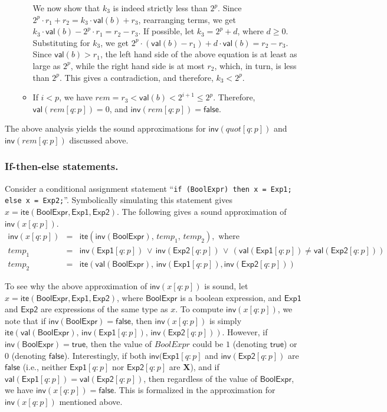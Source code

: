 \documentclass{llncs}
\newcommand{\val}{\ensuremath{\mathsf{val}}}
\newcommand{\inv}{\ensuremath{\mathsf{inv}}}
\newcommand{\ite}{\ensuremath{\mathsf{ite}}}
\newcommand{\true}{\ensuremath{\mathsf{true}}}
\newcommand{\false}{\ensuremath{\mathsf{false}}}
\begin{document}
\begin{itemize}
\begin{itemize}
      We now show that $k_3$ is indeed strictly less than $2^p$.
      Since $2^p\cdot r_1 + r_2 = k_3\cdot {\val}(b) + r_3$,
      rearranging terms, we get $k_3\cdot {\val}(b) - 2^p\cdot r_1 =
      r_2 - r_3$.  If possible, let $k_3 = 2^p + d$, where $d \ge 0$.
      Substituting for $k_3$, we get $2^p\cdot({\val}(b) - r_1) +
      d\cdot {\val}(b) = r_2 - r_3$.  Since ${\val}(b) > r_1$, the
      left hand side of the above equation is at least as large as $
      2^p$, while the right hand side is at most $r_2$, which, in
      turn, is less than $ 2^p$.  This gives a contradiction, and
      therefore, $k_3 < 2^p$.
    \item If $i < p$, we have $rem = r_3 < {\val}(b) < 2^{i+1} \le 2^p$.
      Therefore, ${\val}(rem[q:p]) = 0$, and ${\inv}(rem[q:p]) = \false$.
  \end{itemize}
\end{itemize}
The above analysis yields the sound approximations for
${\inv}(quot[q:p])$ and ${\inv}(rem[q:p])$ discussed above.

\subsubsection{If-then-else statements.} Consider a conditional
assignment statement ``{\tt if (BoolExpr) then x = Exp1; else x =
  Exp2;}''.  Symbolically simulating this statement gives $x =
{\ite}(\mathsf{BoolExpr}, \mathsf{Exp1}, \mathsf{Exp2})$.  The
following gives a sound approximation of ${\inv}(x[q:p])$. \begin{eqnarray}
{\inv}(x[q:p]) & = & {\ite}({\inv}(\mathsf{BoolExpr}), \, temp_1, \, temp_2), \text{ where } \nonumber \\
temp_1         & = & {\inv}(\mathsf{Exp1}[q:p])\,\vee\,{\inv}(\mathsf{Exp2}[q:p])\,\vee\,({\val}(\mathsf{Exp1}[q:p]) \ne {\val}(\mathsf{Exp2}[q:p])) \nonumber \\
temp_2         & = & {\ite}({\val}(\mathsf{BoolExpr}), \,{\inv}(\mathsf{Exp1}[q:p]), {\inv}(\mathsf{Exp2}[q:p])) \nonumber \end{eqnarray}

To see why the above approximation of ${\inv}(x[q:p])$ is sound, let
$x = {\ite}(\mathsf{BoolExpr}, \mathsf{Exp1}, \mathsf{Exp2})$, where
$\mathsf{BoolExpr}$ is a boolean expression, and $\mathsf{Exp1}$ and
$\mathsf{Exp2}$ are expressions of the same type as $x$.  To compute
${\inv}(x[q:p])$, we note that if ${\inv}(\mathsf{BoolExpr}) =
\false$, then ${\inv}(x[q:p])$ is simply
${\ite}({\val}(\mathsf{BoolExpr}), \,{\inv}(\mathsf{Exp1}[q:p]),
\,{\inv}(\mathsf{Exp2}[q:p]))$.  However, if
${\inv}(\mathsf{BoolExpr}) = \true$, then the value of ${BoolExpr}$
could be $1$ (denoting $\true$) or $0$ (denoting $\false$).
Interestingly, if both ${\inv}(\mathsf{Exp1}[q:p]$ and
${\inv}(\mathsf{Exp2}[q:p])$ are $\false$ (i.e., neither
$\mathsf{Exp1}[q:p]$ nor $\mathsf{Exp2}[q:p]$ are $\mathbf{X}$), and
if ${\val}(\mathsf{Exp1}[q:p]) = {\val}(\mathsf{Exp2}[q:p])$, then
regardless of the value of $\mathsf{BoolExpr}$, we have
${\inv}(x[q:p]) = \false$.  This is formalized in the approximation
for ${\inv}(x[q:p])$ mentioned above.
\end{document}
